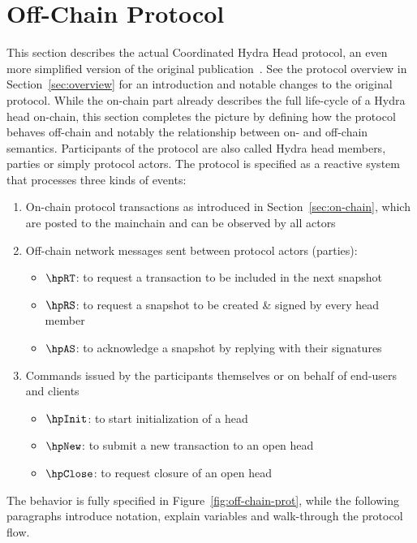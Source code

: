 \section{Off-Chain Protocol}\label{sec:offchain}

This section describes the actual Coordinated Hydra Head protocol, an even more
simplified version of the original publication~\cite{hydrahead20}. See the
protocol overview in Section~\ref{sec:overview} for an introduction and notable
changes to the original protocol. While the on-chain part already describes the
full life-cycle of a Hydra head on-chain, this section completes the picture by
defining how the protocol behaves off-chain and notably the relationship between
on- and off-chain semantics. Participants of the protocol are also called Hydra
head members, parties or simply protocol actors. The protocol is specified as a
reactive system that processes three kinds of events:
\begin{enumerate}
	\item On-chain protocol transactions as introduced in
	      Section~\ref{sec:on-chain}, which are posted to the mainchain and can be
	      observed by all actors
	\item Off-chain network messages sent between protocol actors (parties):
	      \begin{itemize}
		      \item $\hpRT$: to request a transaction to be included in the next snapshot
		      \item $\hpRS$: to request a snapshot to be created \& signed by every head member
		      \item $\hpAS$: to acknowledge a snapshot by replying with their signatures
	      \end{itemize}
	\item Commands issued by the participants themselves or on behalf of end-users and clients
	      \begin{itemize}
		      \item $\hpInit$: to start initialization of a head
		      \item $\hpNew$: to submit a new transaction to an open head
		      \item $\hpClose$: to request closure of an open head
	      \end{itemize}
\end{enumerate}

The behavior is fully specified in Figure~\ref{fig:off-chain-prot}, while the
following paragraphs introduce notation, explain variables and walk-through the
protocol flow.

